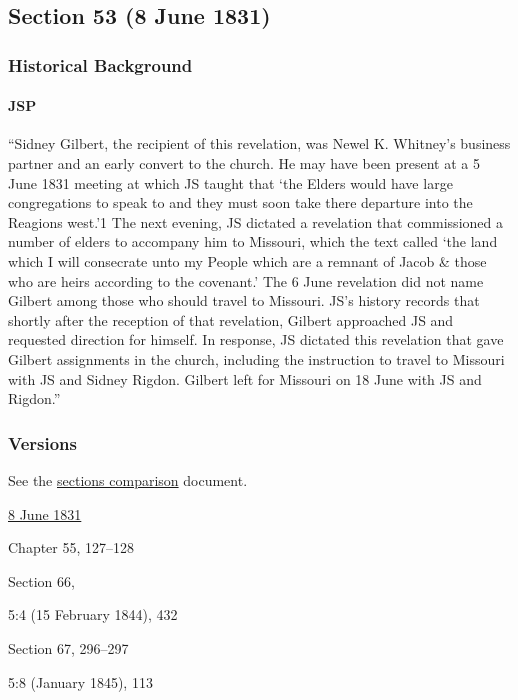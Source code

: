\subsection{Section 53 (8 June 1831)}
	\label{DC53}
	
	\subsubsection{Historical Background}
		\label{DC53-HB}
		
		\paragraph{JSP}
		
			``Sidney Gilbert, the recipient of this revelation, was Newel K. Whitney's business partner and an early convert to the church. He may have been present at a 5 June 1831 meeting at which JS taught that `the Elders would have large congregations to speak to and they must soon take there departure into the Reagions west.'1 The next evening, JS dictated a revelation that commissioned a number of elders to accompany him to Missouri, which the text called `the land which I will consecrate unto my People which are a remnant of Jacob \& those who are heirs according to the covenant.' The 6 June revelation did not name Gilbert among those who should travel to Missouri. JS's history records that shortly after the reception of that revelation, Gilbert approached JS and requested direction for himself. In response, JS dictated this revelation that gave Gilbert assignments in the church, including the instruction to travel to Missouri with JS and Sidney Rigdon. Gilbert left for Missouri on 18 June with JS and Rigdon.''
		
	\subsubsection{Versions}
		\label{DC53-V}
		
		See the \href{https://drive.google.com/file/d/1goAvNz8jS4R8slYfMG_db55Ty2z_vmgK/view?usp=sharing}{sections comparison} document.
	
		\begin{compactdesc}
			\item[JSP] \hyperref[EMS-1831-JS-8-JUN-1831]{8 June 1831}
			\item[BC] Chapter 55, 127--128
			\item[DC 1835] Section 66,
			\item[TS] 5:4 (15 February 1844), 432
			\item[DC 1844] Section 67, 296--297
			\item[MS] 5:8 (January 1845), 113
		\end{compactdesc}

